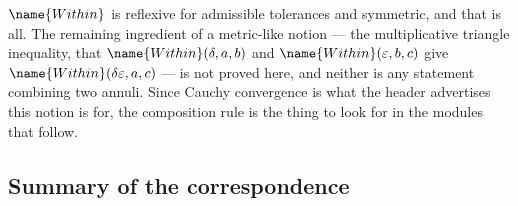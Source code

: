 \begin{remark}\label{Order:rem:no-triangle}
$\name{Within}$ is reflexive for admissible tolerances and symmetric, and
that is all.  The remaining ingredient of a metric-like notion --- the
multiplicative triangle inequality, that $\name{Within}(\delta,a,b)$ and
$\name{Within}(\varepsilon,b,c)$ give
$\name{Within}(\delta\varepsilon, a, c)$ --- is not proved here, and neither
is any statement combining two annuli.  Since Cauchy convergence is what the
header advertises this notion is for, the composition rule is the thing to
look for in the modules that follow.
\end{remark}

\subsection*{Summary of the correspondence}


